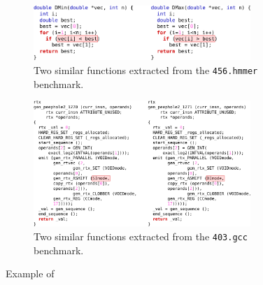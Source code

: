 \begin{figure}[h]
\centering
\begin{subfigure}{\textwidth}
\centering
\includegraphics[width=0.9\textwidth]{src/relatedwork/figs/example-similar-1-hmmer}
\caption{Two similar functions extracted from the \texttt{456.hmmer} benchmark.}
\label{fig:example-similar-1-hmmer}
\end{subfigure}
\begin{subfigure}{\textwidth}
\centering
\includegraphics[width=0.9\textwidth]{src/relatedwork/figs/example-similar-3-gcc}
\caption{Two similar functions extracted from the \texttt{403.gcc} benchmark.}
\label{fig:example-similar-3-gcc}
\end{subfigure}
\caption{Example of }
\label{fig:example-similar}
\end{figure}


